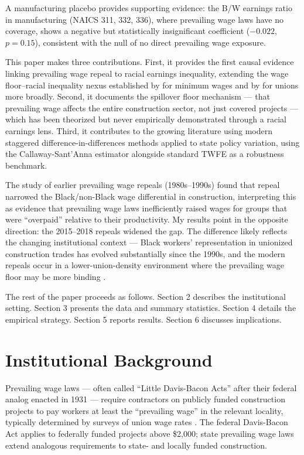 \documentclass[12pt]{article}
\begin{document}
A manufacturing placebo provides supporting evidence: the B/W earnings ratio in manufacturing (NAICS 311, 332, 336), where prevailing wage laws have no coverage, shows a negative but statistically insignificant coefficient ($-0.022$, $p = 0.15$), consistent with the null of no direct prevailing wage exposure.

This paper makes three contributions. First, it provides the first causal evidence linking prevailing wage repeal to racial earnings inequality, extending the wage floor--racial inequality nexus established by \citet{derenoncourt2021minimum} for minimum wages and by \citet{farber2021unions} for unions more broadly. Second, it documents the spillover floor mechanism --- that prevailing wage affects the entire construction sector, not just covered projects --- which has been theorized \citep{azarirad2005economics} but never empirically demonstrated through a racial earnings lens. Third, it contributes to the growing literature using modern staggered difference-in-differences methods \citep{callaway2021difference, goodmanbacon2021difference, sun2021estimating} applied to state policy variation, using the Callaway-Sant'Anna estimator alongside standard TWFE as a robustness benchmark.

The \citet{kessler2001prevailing} study of earlier prevailing wage repeals (1980s--1990s) found that repeal narrowed the Black/non-Black wage differential in construction, interpreting this as evidence that prevailing wage laws inefficiently raised wages for groups that were ``overpaid'' relative to their productivity. My results point in the opposite direction: the 2015--2018 repeals widened the gap. The difference likely reflects the changing institutional context --- Black workers' representation in unionized construction trades has evolved substantially since the 1990s, and the modern repeals occur in a lower-union-density environment where the prevailing wage floor may be more binding \citep{western2011unions, card2001effect}.

The rest of the paper proceeds as follows. Section 2 describes the institutional setting. Section 3 presents the data and summary statistics. Section 4 details the empirical strategy. Section 5 reports results. Section 6 discusses implications.


\section{Institutional Background}

Prevailing wage laws --- often called ``Little Davis-Bacon Acts'' after their federal analog enacted in 1931 --- require contractors on publicly funded construction projects to pay workers at least the ``prevailing wage'' in the relevant locality, typically determined by surveys of union wage rates \citep{thieblot1975davisbacon}. The federal Davis-Bacon Act applies to federally funded projects above \$2,000; state prevailing wage laws extend analogous requirements to state- and locally funded construction.
\end{document}

